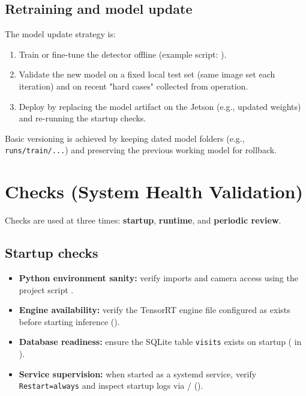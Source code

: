 \subsection{Retraining and model update}

\noindent
The model update strategy is:
\begin{enumerate}
	\item Train or fine-tune the detector offline (example script: ).
	\item Validate the new model on a fixed local test set (same image set each iteration) and on recent "hard cases" collected from operation.
	\item Deploy by replacing the model artifact on the Jetson (e.g., updated  weights) and re-running the startup checks.
\end{enumerate}

\noindent
Basic versioning is achieved by keeping dated model folders (e.g., \texttt{runs/train/...}) and preserving the previous working model for rollback.

\section{Checks (System Health Validation)}

\noindent
Checks are used at three times: \textbf{startup}, \textbf{runtime}, and \textbf{periodic review}.

\subsection{Startup checks}

\begin{itemize}
	\item \textbf{Python environment sanity:} verify imports and camera access using the project script
	.
	
	\item \textbf{Engine availability:} verify the TensorRT engine file configured as
	 exists before starting inference
	().
	
	\item \textbf{Database readiness:} ensure the SQLite table \texttt{visits} exists on startup
	( in
	).
	
	\item \textbf{Service supervision:} when started as a systemd service, verify \texttt{Restart=always}
	and inspect startup logs via  / 
	().
\end{itemize}

